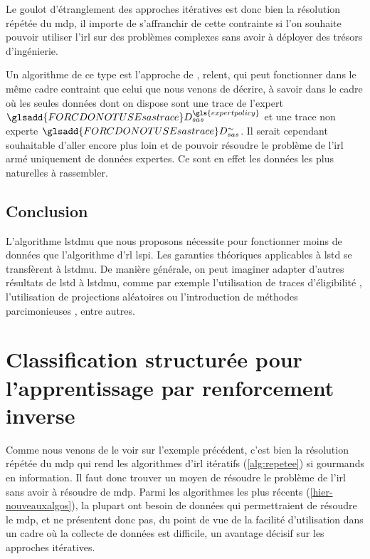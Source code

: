 \documentclass[frenchb,a4paper,justified,notoc]{tufte-book}
\newcommand{\expertpolicy}{\gls{expertpolicy}}
\newcommand{\sastrace}[1]{\ensuremath{\glsadd{FORCDONOTUSEsastrace}D_{sas}^{#1}}}
\begin{document}
\begin{figure}
\label{fig:lstdmuexp}
\end{figure}


Le goulot d'étranglement des approches itératives est donc bien la résolution répétée du \gls{mdp}, il importe de s'affranchir de cette contrainte si l'on souhaite pouvoir utiliser l'\gls{irl} sur des problèmes complexes sans avoir à déployer des trésors d'ingénierie.

Un algorithme de ce type est l'approche de \citet{boularias2011relative}, \gls{relent}, qui peut fonctionner dans le même cadre contraint que celui que nous venons de décrire, à savoir dans le cadre où les seules données dont on dispose sont une trace de l'expert $\sastrace{\expertpolicy}$ et une trace non experte $\sastrace{\sim}$. Il serait cependant souhaitable d'aller encore plus loin et de pouvoir résoudre le problème de l'\gls{irl} armé uniquement de données expertes. Ce sont en effet les données les plus naturelles à rassembler.
\section{Conclusion}
\label{sec-4-5}


L'algorithme \gls{lstdmu} que nous proposons nécessite pour fonctionner moins de données que l'algorithme d'\gls{rl} \gls{lspi}. Les garanties théoriques applicables à \gls{lstd} se transfèrent à \gls{lstdmu}. De manière générale, on peut imaginer adapter d'autres résultats de \gls{lstd} à \gls{lstdmu}, comme par exemple l'utilisation de traces d'éligibilité \citep{geist2012recursive}, l'utilisation de projections aléatoires \citep{ghavamzadeh2010lstd} ou l'introduction de méthodes parcimonieuses \citep{kolter2009regularization,geist2012dantzig}, entre autres.
\chapter{Classification structurée pour l'apprentissage par renforcement inverse}
\label{sec-5}
\label{hier-scirl}

Comme nous venons de le voir sur l'exemple précédent, c'est bien la résolution répétée du \gls{mdp} qui rend les algorithmes d'\gls{irl} itératifs (\autoref{alg:repetee}) si gourmands en information. Il faut donc trouver un moyen de résoudre le problème de l'\gls{irl} sans avoir à résoudre de \gls{mdp}. Parmi les algorithmes les plus récents (\autoref{hier-nouveauxalgos}), la plupart ont besoin de données qui permettraient de résoudre le \gls{mdp}, et ne présentent donc pas, du point de vue de la facilité d'utilisation dans un cadre où la collecte de données est difficile, un avantage décisif sur les approches itératives.
\end{document}
